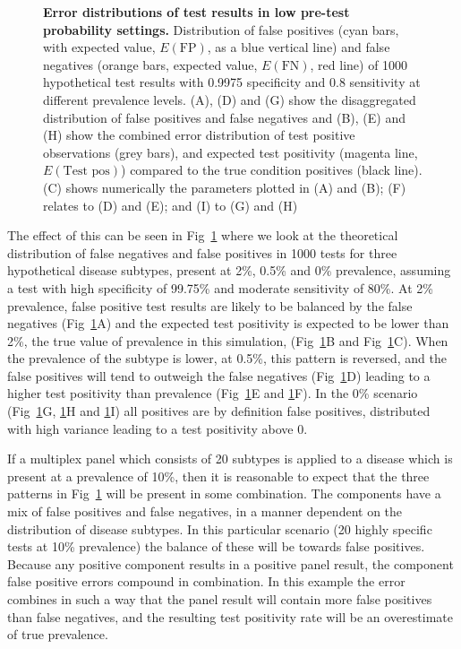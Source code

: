 \documentclass[10pt,letterpaper]{article}
\begin{document}
\begin{figure}[hb!]
\caption{{\bf Error distributions of test results in low pre-test probability settings.}
 Distribution of false positives (cyan bars, with expected value, \(E(\textrm{FP})\), as a blue vertical line) and false negatives (orange bars, expected value, \(E(\textrm{FN})\), red line) of 1000 hypothetical test results with 0.9975 specificity and 0.8 sensitivity at different prevalence levels. (A), (D) and (G) show the disaggregated distribution of false positives and false negatives and (B), (E) and (H) show the combined error distribution of test positive observations (grey bars), and expected test positivity (magenta line, \(E(\textrm{Test pos})\)) compared to the true condition positives (black line). (C) shows numerically the parameters plotted in (A) and (B); (F) relates to (D) and (E); and (I) to (G) and (H)}
\label{fig2}
\end{figure}

The effect of this can be seen in Fig~\ref{fig2} where we look at the theoretical distribution of false negatives and false positives in 1000 tests for three hypothetical disease subtypes, present at 2\%, 0.5\% and 0\% prevalence, assuming a test with high specificity of 99.75\% and moderate sensitivity of 80\%. At 2\% prevalence, false positive test results are likely to be balanced by the false negatives (Fig~\ref{fig2}A) and the expected test positivity is expected to be lower than 2\%, the true value of prevalence in this simulation, (Fig~\ref{fig2}B and Fig~\ref{fig2}C). When the prevalence of the subtype is lower, at 0.5\%, this pattern is reversed, and the false positives will tend to outweigh the false negatives (Fig~\ref{fig2}D) leading to a higher test positivity than prevalence (Fig~\ref{fig2}E and \ref{fig2}F). In the 0\% scenario (Fig~\ref{fig2}G, \ref{fig2}H and \ref{fig2}I) all positives are by definition false positives,  distributed with high variance leading to a test positivity above 0.

If a multiplex panel which consists of 20 subtypes is applied to a disease which is present at a prevalence of 10\%, then it is reasonable to expect that the three patterns in Fig~\ref{fig2} will be present in some combination. The components have a mix of false positives and false negatives, in a manner dependent on the distribution of disease subtypes. In this particular scenario (20 highly specific tests at 10\% prevalence) the balance of these will be towards false positives. Because any positive component results in a positive panel result, the component false positive errors compound in combination. In this example the error combines in such a way that the panel result will contain more false positives than false negatives, and the resulting test positivity rate will be an overestimate of true prevalence.
\end{document}
